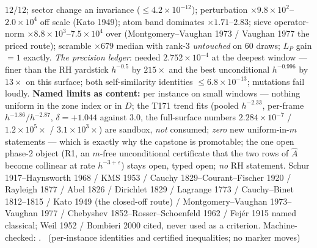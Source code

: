 $12/12$; sector change an invariance ($\le4.2\times10^{-12}$);
perturbation $\times9.8\times10^{2}$--$2.0\times10^{4}$ off scale
(Kato 1949); atom band dominates $\times1.71$--$2.83$; sieve
operator-norm $\times8.8\times10^{3}$--$7.5\times10^{4}$ over
(Montgomery--Vaughan 1973 / Vaughan 1977 the priced route); scramble
$\times679$ median with rank-3 \emph{untouched} on $60$ draws; $L_P$
gain $=1$ exactly.
\emph{The precision ledger}: needed $2.752\times10^{-4}$ at the deepest
window --- finer than the RH yardstick $h^{-0.5}$ by $215\times$ and
the best unconditional $h^{-0.996}$ by $13\times$ on this surface; both
self-similarity identities $\le6.8\times10^{-13}$; mutations fail
loudly.
\textbf{Named limits as content:} per instance on small windows ---
nothing uniform in the zone index or in $D$; the T171 trend fits
(pooled $h^{-2.33}$, per-frame $h^{-1.86}/h^{-2.87}$, $\delta=+1.044$
against $3.0$, the full-surface numbers $2.284\times10^{-7}$ /
$1.2\times10^{5}\times$ / $3.1\times10^{3}\times$) are sandbox,
\emph{not} consumed; \emph{zero} new uniform-in-$m$ statements ---
which is exactly why the capstone is promotable; the one open phase-2
object (R1, an $m$-free unconditional certificate that the two rows of
$\hat A$ become collinear at rate $h^{-3+\varepsilon}$) stays open,
typed open; \emph{no} RH statement.
Schur 1917--Haynsworth 1968 / KMS 1953 / Cauchy 1829--Courant--Fischer
1920 / Rayleigh 1877 / Abel 1826 / Dirichlet 1829 / Lagrange 1773 /
Cauchy--Binet 1812--1815 / Kato 1949 (the closed-off route) /
Montgomery--Vaughan 1973--Vaughan 1977 / Chebyshev
1852--Rosser--Schoenfeld 1962 / Fej\'er 1915 named classical; Weil 1952
/ Bombieri 2000 cited, never used as a criterion.
Machine-checked:
.
\mE\ (per-instance identities and certified inequalities; no marker moves)


